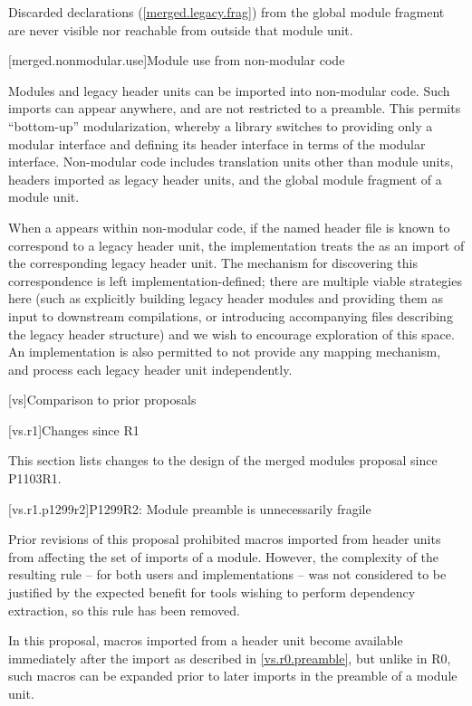 \pnum
Discarded declarations (\ref{merged.legacy.frag}) from the global module
fragment are never visible nor reachable from outside that module unit.

[merged.nonmodular.use]{Module use from non-modular code}

\pnum
Modules and legacy header units can be imported into non-modular code.
Such imports can appear anywhere, and are not restricted to a preamble.
This permits ``bottom-up'' modularization,
whereby a library switches to providing only a modular interface
and defining its header interface in terms of the modular interface.
Non-modular code includes translation units other than module units,
headers imported as legacy header units, and the global module fragment
of a module unit.

\pnum
When a  appears within non-modular code,
if the named header file is known to correspond to a legacy header unit,
the implementation treats the  as an import
of the corresponding legacy header unit.
The mechanism for discovering this correspondence
is left implementation-defined;
there are multiple viable strategies here
(such as explicitly building legacy header modules and
providing them as input to downstream compilations, or
introducing accompanying files describing the legacy header structure)
and we wish to encourage exploration of this space.
An implementation is also permitted to not provide any mapping mechanism,
and process each legacy header unit independently.

[vs]{Comparison to prior proposals}

[vs.r1]{Changes since R1}

\pnum
This section lists changes to the design of the merged modules proposal
since P1103R1.

[vs.r1.p1299r2]{P1299R2: Module preamble is unnecessarily fragile}

\pnum
Prior revisions of this proposal prohibited macros imported from header
units from affecting the set of imports of a module. However, the
complexity of the resulting rule -- for both users and implementations
-- was not considered to be justified by the expected benefit for
tools wishing to perform dependency extraction, so this rule has been
removed.

\pnum
In this proposal, macros imported from a header unit become available
immediately after the import as described in \ref{vs.r0.preamble},
but unlike in R0, such macros can be expanded prior to later
imports in the preamble of a module unit.

